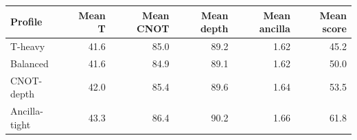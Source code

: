 \begin{tabular}{lrrrrr}
\toprule
Profile & Mean T & Mean CNOT & Mean depth & Mean ancilla & Mean score \\
\midrule
T-heavy & 41.6 & 85.0 & 89.2 & 1.62 & 45.2 \\
Balanced & 41.6 & 84.9 & 89.1 & 1.62 & 50.0 \\
CNOT-depth & 42.0 & 85.4 & 89.6 & 1.64 & 53.5 \\
Ancilla-tight & 43.3 & 86.4 & 90.2 & 1.66 & 61.8 \\
\bottomrule
\end{tabular}

